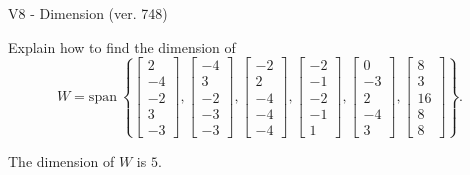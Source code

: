 \begin{exercise}
  \begin{exerciseTitle}V8 - Dimension (ver. 748)\end{exerciseTitle}
  \begin{exerciseStatement}
    Explain how to find the dimension of 
\[W=\mathrm{span}\ \left\{\left[\begin{array}{r}
2 \\
-4 \\
-2 \\
3 \\
-3
\end{array}\right] , \left[\begin{array}{r}
-4 \\
3 \\
-2 \\
-3 \\
-3
\end{array}\right] , \left[\begin{array}{r}
-2 \\
2 \\
-4 \\
-4 \\
-4
\end{array}\right] , \left[\begin{array}{r}
-2 \\
-1 \\
-2 \\
-1 \\
1
\end{array}\right] , \left[\begin{array}{r}
0 \\
-3 \\
2 \\
-4 \\
3
\end{array}\right] , \left[\begin{array}{r}
8 \\
3 \\
16 \\
8 \\
8
\end{array}\right]\right\}.\]



  \end{exerciseStatement}
  \begin{exerciseAnswer}
   The dimension of \(W\) is  \(5\).
  


  \end{exerciseAnswer}
\end{exercise}